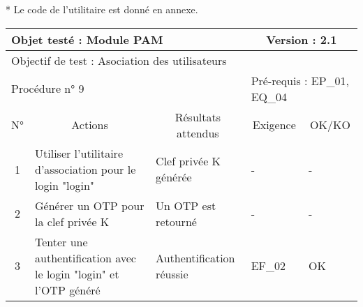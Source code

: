 \documentclass{"../../res/univ-projet"}
\begin{document}
\begin{center}
	* Le code de l'utilitaire est donné en annexe.
	
	
	\vskip 2.2cm
	\begin{tabular}{|c|p{5cm}|p{5cm}|p{1.5cm}|p{1.5cm}|}
      \hline
      \multicolumn{3}{|l|}{Objet testé : Module PAM} & \multicolumn{2}{c|}{Version : 2.1}\\ \hline
      \multicolumn{5}{|l|}{Objectif de test : Asociation des utilisateurs}\\ \hline
      \multicolumn{3}{|l|}{Procédure n° 9} & \multicolumn{2}{p{3cm}|}{Pré-requis : EP\_01, EQ\_04 }\\ \hline
      \multicolumn{1}{|c|}{N°} & \multicolumn{1}{c|}{Actions} & \multicolumn{1}{c|}{Résultats attendus} & 
      \multicolumn{1}{c|}{Exigence} & \multicolumn{1}{c|}{OK/KO}\\ \hline
      1 & Utiliser l'utilitaire d'association pour le login "login" & Clef privée K générée & - & - \\
      2 & Générer un OTP pour la clef privée K & Un OTP est retourné & - & - \\
      3 & Tenter une authentification avec le login "login" et l'OTP généré & Authentification réussie & EF\_02 & OK \\      
      \hline
    \end{tabular} 
	 
  \end{center}
\end{document}
